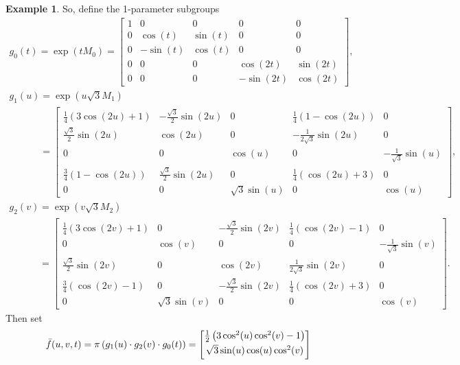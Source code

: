 \documentclass[pdftex]{sigma}
\numberwithin{equation}{section}
\theoremstyle{definition}
\newtheorem{exmpl}[teo]{Example}
\begin{document}
\begin{exmpl}
So, def\/ine the 1-parameter subgroups
\begin{gather*}
g_0(t)=\exp(tM_0) =
\begin{bmatrix}
1 & 0 & 0 & 0 & 0
\\
0 & \cos(t) & \sin(t) & 0 & 0
\\
0 & -\sin(t) & \cos(t) & 0 & 0
\\
0 & 0 & 0 & \cos(2t) & \sin(2t)
\\
0 & 0 & 0 & -\sin(2t) & \cos(2t)
\end{bmatrix},
\\
g_1(u)=\exp(u \sqrt{3} M_1)
\\
\phantom{g_1(u)}
=
\begin{bmatrix}
\tfrac{1}{4}(3 \cos(2u) + 1) & -\tfrac{\sqrt{3}}{2}\sin(2u) & 0 & \tfrac{1}{4} (1 - \cos(2u)) & 0
\\
\tfrac{\sqrt{3}}{2}\sin(2u) & \cos(2u) & 0 & -\tfrac{1}{2\sqrt{3}} \sin(2u) & 0
\\
0 & 0 & \cos(u) & 0 & -\tfrac{1}{\sqrt{3}} \sin(u)
\\
\tfrac{3}{4}(1 - \cos(2u)) & \tfrac{\sqrt{3}}{2}\sin(2u) & 0 & \tfrac{1}{4}(\cos(2u) + 3) & 0
\\
0 & 0 & \sqrt{3} \sin(u) & 0 & \cos(u)
\end{bmatrix},
\\
g_2(v)=\exp(v \sqrt{3} M_2)
\\
\phantom{g_2(v)}
=
\begin{bmatrix}
\tfrac{1}{4}(3 \cos(2v) + 1) & 0 & -\tfrac{\sqrt{3}}{2}\sin(2v) & \tfrac{1}{4} (\cos(2v) - 1) & 0
\\
0 & \cos(v) & 0 & 0 & -\tfrac{1}{\sqrt{3}}\sin(v)
\\
\tfrac{\sqrt{3}}{2}\sin(2v) & 0 & \cos(2v) & \tfrac{1}{2\sqrt{3}} \sin(2v) & 0
\\
\tfrac{3}{4}(\cos(2v) - 1) & 0 & -\tfrac{\sqrt{3}}{2}\sin(2v) & \tfrac{1}{4}(\cos(2v) + 3) & 0
\\
0 & \sqrt{3} \sin(v) & 0 & 0 & \cos(v)
\end{bmatrix}.
\end{gather*}
Then set
\begin{gather}
\bar{f}(u,v,t) = \pi\left(g_1(u) \cdot g_2(v) \cdot g_0(t) \right) =
\begin{bmatrix}
\tfrac{1}{2}\left(3\cos^2(u)\cos^2(v) - 1 \right)
\vspace{1mm}\\
\sqrt{3} \sin(u) \cos(u) \cos^2(v)
\vspace{1mm}\\

\end{bmatrix}
\end{gather}
\end{exmpl}
\end{document}
